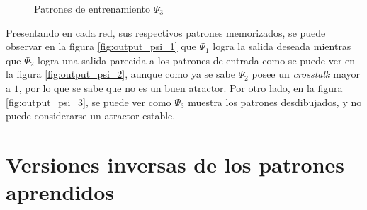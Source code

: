 \documentclass{sig-alternate}
\begin{document}
\begin{figure}[ht]
		\begin{center}
			\hspace{10pt}
			\hspace{10pt}
			\hspace{10pt}
			\hspace{10pt}
		\end{center}
	\caption{Patrones de entrenamiento $\Psi_3$}
	\label{fig:psi_3}
\end{figure}


Presentando en cada red, sus respectivos patrones memorizados, se puede observar en la figura \ref{fig:output_psi_1} que $\Psi_1$ logra la salida deseada mientras que $\Psi_2$ logra una salida parecida a los patrones de entrada como se puede ver en la figura \ref{fig:output_psi_2}, aunque  como ya se sabe $\Psi_2$ posee un \textit{crosstalk} mayor a $1$, por lo que se sabe que no es un buen atractor. Por otro lado, en la figura \ref{fig:output_psi_3}, se puede ver como $\Psi_3$ muestra los patrones desdibujados, y no puede considerarse un atractor estable.\\
 
 \section*{Versiones inversas de los patrones aprendidos}
\end{document}

